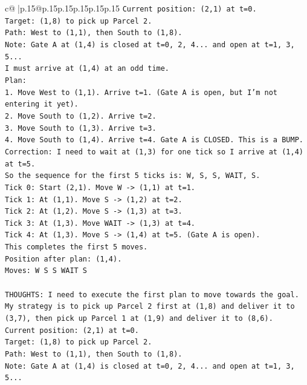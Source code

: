 \documentclass{article}
\begin{document}
{\begin{supertabular}{c@{$\;$}|p{.15\linewidth}@{}p{.15\linewidth}p{.15\linewidth}p{.15\linewidth}p{.15\linewidth}p{.15\linewidth}}
{{{\texttt{Current position: (2,1) at t=0.} \\
\texttt{Target: (1,8) to pick up Parcel 2.} \\
\texttt{Path: West to (1,1), then South to (1,8).} \\
\texttt{Note: Gate A at (1,4) is closed at t=0, 2, 4... and open at t=1, 3, 5...} \\
\texttt{I must arrive at (1,4) at an odd time.} \\
\texttt{Plan:} \\
\texttt{1. Move West to (1,1). Arrive t=1. (Gate A is open, but I'm not entering it yet).} \\
\texttt{2. Move South to (1,2). Arrive t=2.} \\
\texttt{3. Move South to (1,3). Arrive t=3.} \\
\texttt{4. Move South to (1,4). Arrive t=4. Gate A is CLOSED. This is a BUMP.} \\
\texttt{Correction: I need to wait at (1,3) for one tick so I arrive at (1,4) at t=5.} \\
\texttt{So the sequence for the first 5 ticks is: W, S, S, WAIT, S.} \\
\texttt{Tick 0: Start (2,1). Move W {-}> (1,1) at t=1.} \\
\texttt{Tick 1: At (1,1). Move S {-}> (1,2) at t=2.} \\
\texttt{Tick 2: At (1,2). Move S {-}> (1,3) at t=3.} \\
\texttt{Tick 3: At (1,3). Move WAIT {-}> (1,3) at t=4.} \\
\texttt{Tick 4: At (1,3). Move S {-}> (1,4) at t=5. (Gate A is open).} \\
\texttt{This completes the first 5 moves.} \\
\texttt{Position after plan: (1,4).} \\
\texttt{Moves: W S S WAIT S} \\
\\ 
\texttt{THOUGHTS: I need to execute the first plan to move towards the goal. My strategy is to pick up Parcel 2 first at (1,8) and deliver it to (3,7), then pick up Parcel 1 at (1,9) and deliver it to (8,6).} \\
\texttt{Current position: (2,1) at t=0.} \\
\texttt{Target: (1,8) to pick up Parcel 2.} \\
\texttt{Path: West to (1,1), then South to (1,8).} \\
\texttt{Note: Gate A at (1,4) is closed at t=0, 2, 4... and open at t=1, 3, 5...} \\
}}}
\end{supertabular}}
\end{document}

